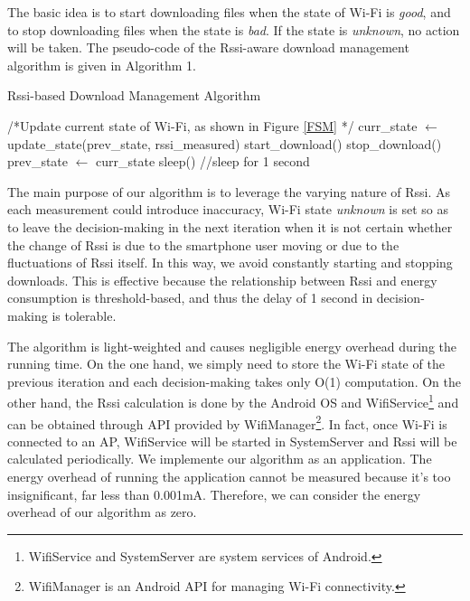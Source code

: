\documentclass[journal]{IEEEtran}
\begin{document}
The basic idea 
is to start downloading files when the state of Wi-Fi is \textit{good}, and to stop downloading files when the state is \textit{bad}. If the state 
is \textit{unknown}, 
no action will be taken.
The pseudo-code of the Rssi-aware download management algorithm is given in Algorithm 1.

\begin{algorithm}
\caption{Rssi-based Download Management Algorithm}\label{rssi_algorithm}
\begin{algorithmic}[1]
\State /*Update current state of Wi-Fi,  
\State  *as shown in Figure \ref{FSM} */
\State curr\_state $\gets$ update\_state(prev\_state, rssi\_measured)
\State start\_download()
\State stop\_download()
\EndIf
\State prev\_state $\gets$ curr\_state
\State sleep() //sleep for 1 second
\EndWhile
\end{algorithmic}
\end{algorithm}

The main purpose of our algorithm is to leverage the varying nature of Rssi. 
As each measurement could introduce inaccuracy, Wi-Fi state \textit{unknown}
is set so as to leave the decision-making in the next iteration when 
it is not certain whether the change of Rssi is due to the smartphone user moving or due to
the fluctuations of Rssi itself.
In this way, we avoid constantly starting and stopping downloads.
This is effective because the relationship between Rssi and energy consumption is threshold-based, 
and thus the delay of 1 second in decision-making is tolerable.

The algorithm is light-weighted and causes negligible energy overhead during the running time. 
On the one hand, we simply need to store the Wi-Fi state of the previous iteration
and each decision-making takes only O(1) computation.
On the other hand, the Rssi calculation is done by the Android OS and WifiService\footnote[1]{WifiService and 
SystemServer are system services of Android.}
and can be obtained through API provided by WifiManager\footnote[2]{WifiManager is an Android API for managing Wi-Fi connectivity.}.
In fact, once Wi-Fi is connected to an AP, 
WifiService will be started in SystemServer
and Rssi will be calculated periodically.
We implemente our algorithm as an application.
The energy overhead of running the application 
cannot be measured because it's too insignificant, far less than 0.001mA. 
Therefore, we can consider the energy overhead of our algorithm
as zero.
\end{document}
